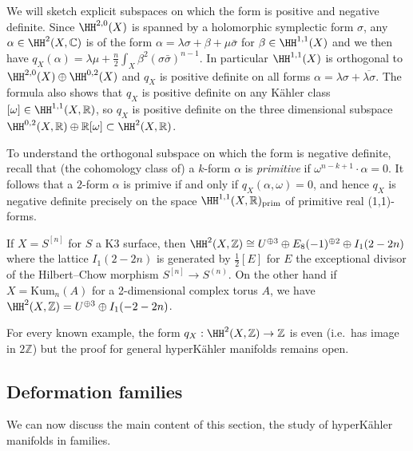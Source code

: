 We will sketch explicit subspaces on which the form is
positive and negative definite. Since \(\HH^{2,0}(X)\) is spanned by a holomorphic symplectic form \(\sigma\), any \(\alpha\in \HH^2(X,\mathbb{C})\) is of the form \(\alpha=\lambda \sigma + \beta + \mu\bar\sigma\) for \(\beta\in
\HH^{1,1}(X)\) and we then have \(q_X(\alpha)=\lambda\mu + \frac{n}{2}\int_X
\beta^2(\sigma\bar\sigma)^{n-1}.\) In particular \(\HH^{1,1}(X)\) is orthogonal
to \(\HH^{2,0}(X)\oplus \HH^{0,2}(X)\) and \(q_X\) is positive definite on all
forms \(\alpha=\lambda\sigma+\overline{\lambda \sigma}\). The formula also shows
that \(q_X\) is positive definite on any K\"ahler class \([\omega]\in
\HH^{1,1}(X,\mathbb{R})\), so \(q_X\) is positive definite on the three
dimensional subspace \(\HH^{0,2}(X,\mathbb{R})\oplus \mathbb{R}[\omega]\subset
\HH^2(X,\mathbb{R})\).

To understand the orthogonal subspace on which the form is negative
definite, recall that (the cohomology class of) a \(k\)-form \(\alpha\) is
\textit{primitive} if \(\omega^{n-k+1}\cdot \alpha=0\). It follows that a
\(2\)-form \(\alpha\) is primive if and only if \(q_X(\alpha,\omega)=0\), and
hence \(q_X\) is negative definite precisely on the space
\(\HH^{1,1}(X,\mathbb{R})_\text{prim}\) of primitive real (1,1)-forms.

\begin{example}
    If \(X=S^{[n]}\) for \(S\) a K3 surface, then \(\HH^2(X,\mathbb{Z})\cong
    U^{\oplus 3} \oplus E_8(-1)^{\oplus 2} \oplus I_1(2-2n)\) where the lattice
    \(I_1(2-2n)\) is generated by \(\frac{1}{2}[E]\) for \(E\) the exceptional
    divisor of the Hilbert--Chow morphism \(S^{[n]}\to S^{(n)}\).
    On the other hand if \(X=\text{Kum}_n(A)\) for a 2-dimensional complex torus
    \(A\), we have \(\HH^2(X,\mathbb{Z})=U^{\oplus 3}\oplus I_1(-2-2n)\).
\end{example}

\begin{remark}
    For every known example, the form \(q_X:\HH^2(X,\mathbb{Z})\to \mathbb{Z}\)
    is even (i.e.\ has image in \(2\mathbb{Z}\)) but the proof for general
    hyperK\"ahler manifolds remains open.
\end{remark}

\subsection{Deformation families} We can now discuss the main content of this
section, the study of hyperK\"ahler manifolds in families.

